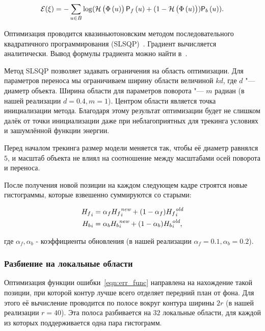 \begin{equation}
\label{eqn:err_func}
\mathcal{E}(\xi) = - \sum\limits_{\mathnormal{u} \in B}
\log(\mathcal{H} \left( \Phi \left( \mathnormal{u} \right) \right) \mathsf{P}_f \left( \mathnormal{u} \right) + (1 - \mathcal{H} \left( \Phi \left( \mathnormal{u} \right) \right))\mathsf{P}_b \left( \mathnormal{u} \right))
\text{.}
\end{equation}

Оптимизация проводится квазиньютоновским методом последовательного
квадратичного
программирования (SLSQP)~\cite{SLSQP}.
Градиент вычисляется аналитически.
Вывод формулы градиента можно найти в~\cite{Tjaden2018}.

Метод SLSQP позволяет задавать ограничения на область оптимизации.
Для параметров переноса мы ограничиваем ширину области величиной $kd$, где $d$
"--- диаметр объекта.
Ширина области для параметров поворота "--- $m$ радиан (в нашей реализации $d
=0.4, m = 1$).
Центром области является точка инициализации метода.
Благодаря этому результат оптимизации будет не слишком далёк от точки
инициализации даже при неблагоприятных для трекинга условиях и зашумлённой
функции энергии.

Перед началом трекинга размер модели меняется так, чтобы её диаметр равнялся
$5$,
и масштаб объекта не влиял на соотношение между масштабами осей поворота и
переноса.

После получения новой позиции на каждом следующем кадре строятся новые
гистограммы, которые взвешенно суммируются со старыми: 

\begin{align}
{\ensuremath{H_f}}_i &= \alpha_f {H_f}_i^{\text{\it new}} + (1 - \alpha_f)
{H_f}_i^{\text{\it old}} \\{H_b}_i &= \alpha_b
{H_b}_i^{\text{\it new}} + (1 - \alpha_b) {H_b}_i^{\text{\it
old}}\text{,}
\end{align}

где $\alpha_f, \alpha_b$ - коэффициенты обновления (в нашей реализации
$\alpha_f = 0.1, \alpha_b = 0.2$).

\subsubsection*{Разбиение на локальные области}

Оптимизация функции ошибки~\ref{eqn:err_func} направлена на нахождение такой
позиции, при которой контур лучше всего отделяет передний план от фона. 
Для этого её вычисление проводится по полосе вокруг контура ширины $2r$ (в нашей
реализации $r = 40$).
Эта полоса разбивается на $32$ локальные области, для каждой из
которых поддерживается одна пара гистограмм.

